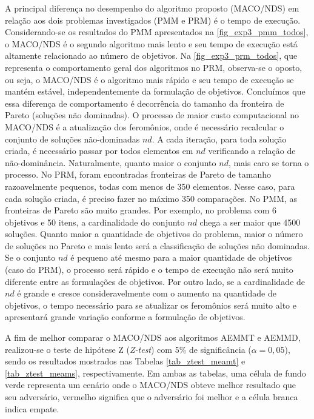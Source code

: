 A principal diferença no desempenho do algoritmo proposto (MACO/NDS) em relação aos dois problemas investigados (PMM e PRM) é o tempo de execução. Considerando-se os resultados do PMM apresentados na \autoref{fig_exp3_pmm_todos}, o MACO/NDS é o segundo algoritmo mais lento e seu tempo de execução está altamente relacionado ao número de objetivos. Na \autoref{fig_exp3_prm_todos}, que representa o comportamento geral dos algoritmos no PRM, observa-se o oposto, ou seja, o MACO/NDS é o algoritmo mais rápido e seu tempo de execução se mantém estável, independentemente da formulação de objetivos. Concluímos que essa diferença de comportamento é decorrência do tamanho da fronteira de Pareto (soluções não dominadas). O processo de maior custo computacional no MACO/NDS é a atualização dos feromônios, onde é necessário recalcular o conjunto de soluções não-dominadas $nd$. A cada iteração, para toda solução criada, é necessário passar por todos elementos em $nd$ verificando a relação de não-dominância. Naturalmente, quanto maior o conjunto $nd$, mais caro se torna o processo. No PRM, foram encontradas fronteiras de Pareto de tamanho razoavelmente pequenos, todas com menos de 350 elementos. Nesse caso, para cada solução criada, é preciso fazer no máximo 350 comparações. No PMM, as fronteiras de Pareto são muito grandes. Por exemplo, no problema com 6 objetivos e 50 itens, a cardinalidade do conjunto $nd$ chega a ser maior que 4500 soluções. Quanto maior a quantidade de objetivos do problema, maior o número de soluções no Pareto e mais lento será a classificação de soluções não dominadas. Se o conjunto $nd$ é pequeno até mesmo para a maior quantidade de objetivos (caso do PRM), o processo será rápido e o tempo de execução não será muito diferente entre as formulações de objetivos. Por outro lado, se a cardinalidade de $nd$ é grande e cresce consideravelmente com o aumento na quantidade de objetivos, o tempo necessário para se atualizar os feromônios será muito alto e apresentará grande variação conforme a formulação de objetivos.

A fim de melhor comparar o MACO/NDS aos algoritmos AEMMT e AEMMD, realizou-se o teste de hipótese Z (\textit{Z-test}) com 5\% de significância ($\alpha=0,05$), sendo os resultados mostrados nas Tabelas \ref{tab_ztest_meamt} e \ref{tab_ztest_meams}, respectivamente. Em ambas as tabelas, uma célula de fundo verde representa um cenário onde o MACO/NDS obteve melhor resultado que seu adversário, vermelho significa que o adversário foi melhor e a célula branca indica empate.

